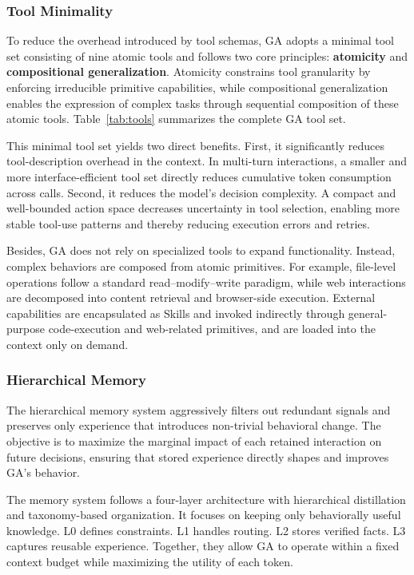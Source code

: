 \subsubsection{Tool Minimality}
\label{sec:tool_minimality} To reduce the overhead introduced by tool schemas, GA adopts a minimal tool set consisting of nine atomic tools and follows two core principles: \textbf{atomicity} and \textbf{compositional generalization}. Atomicity constrains tool granularity by enforcing irreducible primitive capabilities, while compositional generalization enables the expression of complex tasks through sequential composition of these atomic tools. Table~\ref{tab:tools} summarizes the complete GA tool set.

This minimal tool set yields two direct benefits. First, it significantly reduces tool-description overhead in the context. In multi-turn interactions, a smaller and more interface-efficient tool set directly reduces cumulative token consumption across calls. Second, it reduces the model’s decision complexity. A compact and well-bounded action space decreases uncertainty in tool selection, enabling more stable tool-use patterns and thereby reducing execution errors and retries.

Besides, GA does not rely on specialized tools to expand functionality. Instead, complex behaviors are composed from atomic primitives. For example, file-level operations follow a standard read–modify–write paradigm, while web interactions are decomposed into content retrieval and browser-side execution. External capabilities are encapsulated as Skills and invoked indirectly through general-purpose code-execution and web-related primitives, and are loaded into the context only on demand. 

\subsubsection{Hierarchical Memory}
\label{sec:hierarchical_memory} The hierarchical memory system aggressively filters out redundant signals and preserves only experience that introduces non-trivial behavioral change. The objective is to maximize the marginal impact of each retained interaction on future decisions, ensuring that stored experience directly shapes and improves GA's behavior.

The memory system follows a four-layer architecture with hierarchical distillation and taxonomy-based organization. It focuses on keeping only behaviorally useful knowledge. L0 defines constraints. L1 handles routing. L2 stores verified facts. L3 captures reusable experience. Together, they allow GA to operate within a fixed context budget while maximizing the utility of each token.

